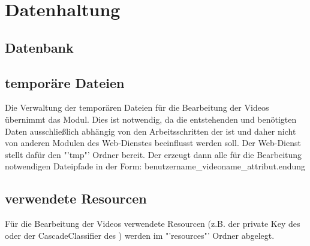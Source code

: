 \section{Datenhaltung}

\subsection{Datenbank}

\subsection{temporäre Dateien}
Die Verwaltung der temporären Dateien für die Bearbeitung der Videos übernimmt das  Modul. Dies ist notwendig, da die entstehenden und benötigten Daten ausschließlich abhängig von den Arbeitsschritten der  ist und daher nicht von anderen Modulen des Web-Dienstes beeinflusst werden soll. Der Web-Dienst stellt dafür den "'tmp"' Ordner bereit.\newline
Der  erzeugt dann alle für die Bearbeitung notwendigen Dateipfade in der Form:\newline
benutzername\_videoname\_attribut.endung

\subsection{verwendete Resourcen}
Für die Bearbeitung der Videos verwendete Resourcen (z.B. der private Key des  oder der CascadeClassifier des ) werden im "'resources"' Ordner abgelegt.
